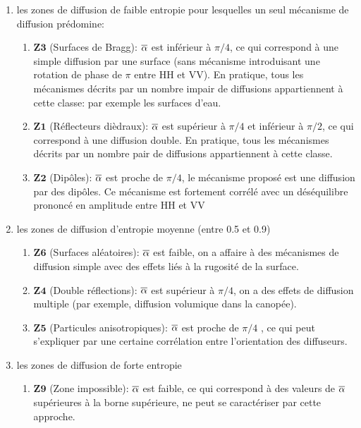 \begin{enumerate}
    \item les zones de diffusion de faible entropie pour lesquelles un seul mécanisme de
diffusion prédomine:
    \begin{enumerate}
    \item  $\boldsymbol{Z3}$  (Surfaces de Bragg):  $\overline{\alpha}$ est inférieur à $\pi/4$, ce qui correspond à une simple diffusion par une surface (sans mécanisme introduisant une rotation de phase de $\pi$ entre HH et VV). En pratique, tous les mécanismes décrits par un nombre impair de diffusions appartiennent à cette classe: par exemple les surfaces d'eau.
    
    \item $\boldsymbol{Z1}$ (Réflecteurs dièdraux):  $\overline{\alpha}$ est supérieur à $\pi/4$ et inférieur à $\pi/2$, ce qui correspond à une diffusion double. En pratique, tous les mécanismes décrits par un nombre pair de diffusions appartiennent à cette classe.
    \item $\boldsymbol{Z2}$ (Dipôles):  $\overline{\alpha}$ est proche de $\pi/4$, le mécanisme proposé est une diffusion par des dipôles. Ce mécanisme est fortement corrélé avec un déséquilibre prononcé en amplitude entre HH et VV
    \end{enumerate}
    
    \item les zones de diffusion d'entropie moyenne (entre 0.5 et 0.9)
    
     \begin{enumerate}
    \item  $\boldsymbol{Z6}$  (Surfaces aléatoires): $\overline{\alpha}$ est faible, on a affaire à des mécanismes de diffusion simple avec des effets liés à la rugosité de la surface.
     \item  $\boldsymbol{Z4}$  (Double réflections):  $\overline{\alpha}$ est supérieur à $\pi/4$, on a des effets de diffusion multiple (par exemple, diffusion volumique dans la canopée).
      \item  $\boldsymbol{Z5}$  (Particules anisotropiques):  $\overline{\alpha}$ est proche de $\pi/4$ , ce qui peut s’expliquer par une certaine corrélation entre l’orientation des diffuseurs.

      \end{enumerate}
      
      
     \item les zones de diffusion de forte entropie
     \begin{enumerate}
       \item  $\boldsymbol{Z9}$ (Zone impossible):  $\overline{\alpha}$ est faible, ce qui correspond à des valeurs de $\overline{\alpha}$ supérieures à la borne supérieure, ne peut se caractériser par cette approche.


\end{enumerate}
\end{enumerate}
